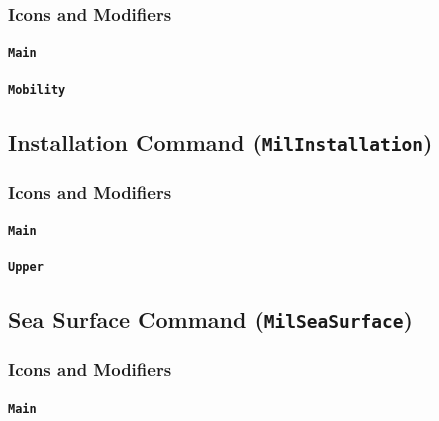 \documentclass[a4paper, titlepage]{article}
\begin{document}
\subsubsection{Icons and Modifiers}

\paragraph{\texttt{Main}}
%

\paragraph{\texttt{Mobility}}
%

\subsection{Installation Command (\textbf{\texttt{MilInstallation}})}

\subsubsection{Icons and Modifiers}

\paragraph{\texttt{Main}}
%

\paragraph{\texttt{Upper}}
%

\subsection{Sea Surface Command (\textbf{\texttt{MilSeaSurface}})}

\subsubsection{Icons and Modifiers}

\paragraph{\texttt{Main}}
%
\end{document}

